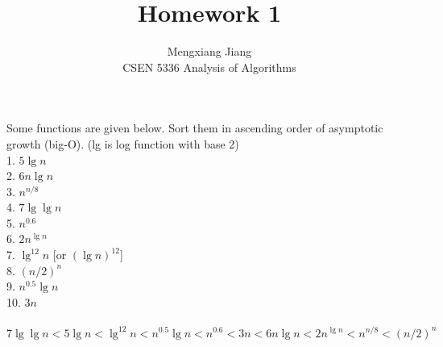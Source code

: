 \documentclass[12pt]{article}
\newenvironment{problem}[2][Problem]{\begin{trivlist}
\item[\hskip \labelsep {\bfseries #1}\hskip \labelsep {\bfseries #2.}]}{\end{trivlist}}
\begin{document}
 
 
\title{Homework 1}%
\author{Mengxiang Jiang\\ %
CSEN 5336 Analysis of Algorithms} %
 
\maketitle
 
\begin{problem}{1} %
    Some functions are given below. Sort them in ascending order of asymptotic growth (big-O). (lg is log function with base 2)\\
    1. $5\lg{n}$\\
    2. $6n\lg{n}$\\
    3. $n^{n/8}$\\
    4. $7\lg{\lg{n}}$\\
    5. $n^{0.6}$\\
    6. $2n^{\lg{n}}$\\
    7. $\lg^{12}{n}$ [or $(\lg{n})^{12}$]\\
    8. $(n/2)^n$ \\
    9. $n^{0.5}\lg{n}$\\
    10. $3n$\\
    \\
    $7\lg{\lg{n}} < 5\lg{n} < \lg^{12}{n} < n^{0.5}\lg{n} < n^{0.6} < 3n < 6n\lg{n} < 2n^{\lg{n}} < n^{n/8} < (n/2)^n$
\end{problem}
\end{document}
